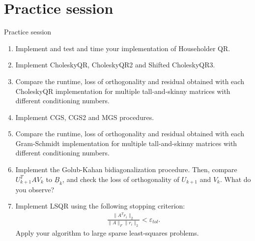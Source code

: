 \documentclass[t,usepdftitle=false]{beamer}
\begin{document}
\section{Practice session}
\begin{frame}[fragile]{Practice session}
\begin{enumerate}
\item Implement and test and time your implementation of Householder QR.
\item Implement CholeskyQR, CholeskyQR2 and Shifted CholeskyQR3.
\item Compare the runtime, loss of orthogonality and residual obtained with each CholeskyQR implementation for multiple tall-and-skinny matrices with different conditioning numbers.
\item Implement CGS, CGS2 and MGS procedures.
\item Compare the runtime, loss of orthogonality and residual obtained with each Gram-Schmidt implementation for multiple tall-and-skinny matrices with different conditioning numbers.
\item Implement the Golub-Kahan bidiagonalization procedure.
Then, compare $U_{k+1}^TAV_k$ to $\underline{B}_k$, and check the loss of orthogonality of $U_{k+1}$ and $V_k$. What do you observe?
\item Implement LSQR using the following stopping criterion:
\begin{align*}
\frac{\|A^Tr_i\|_2}{\|A\|_F\|r_i\|_2}<\varepsilon_{tol}.
\end{align*}
Apply your algorithm to large sparse least-squares problems.
\end{enumerate}
\end{frame}
\end{document}
